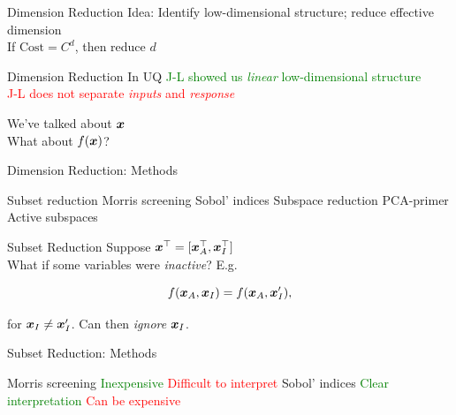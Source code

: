 \documentclass[14pt]{beamer}
\begin{document}

\begin{frame}{Dimension Reduction}
  Idea: Identify low-dimensional structure; reduce effective dimension \\
  If $\text{Cost} = C^d$, then reduce $d$
\end{frame}

\begin{frame}{Dimension Reduction \alert{In UQ}}
  \bigskip \textcolor{green}{J-L showed us \emph{linear} low-dimensional structure} \\
  \textcolor{red}{J-L does not separate \emph{inputs} and \emph{response}}

  \bigskip We've talked about $\boldsymbol{x}$ \\
  What about $f(\boldsymbol{x})$?
\end{frame}

\begin{frame}{Dimension Reduction: Methods}
  \begin{outline}
    \1 Subset reduction
      \2 Morris screening
      \2 Sobol' indices
    \1 Subspace reduction
      \2 PCA-primer
      \2 Active subspaces
  \end{outline}
\end{frame}

\begin{frame}{Subset Reduction}
  Suppose $\boldsymbol{x}^{\top} = [\boldsymbol{x}_A^{\top}, \boldsymbol{x}_I^{\top}]$ \\
  What if some variables were \emph{inactive}? E.g.

  \begin{equation}
    f(\boldsymbol{x}_A, \boldsymbol{x}_I) = f(\boldsymbol{x}_A, \boldsymbol{x}'_I),
  \end{equation}

  \noindent for $\boldsymbol{x}_I \neq \boldsymbol{x}'_I$. Can then \emph{ignore} $\boldsymbol{x}_I$.
\end{frame}

\begin{frame}{Subset Reduction: Methods}
  \begin{outline}
    \1 Morris screening
      \2 \textcolor{green}{Inexpensive}
      \2 \textcolor{red}{Difficult to interpret}
    \1 Sobol' indices
      \2 \textcolor{green}{Clear interpretation}
      \2 \textcolor{red}{Can be expensive}
  \end{outline}
\end{frame}
\end{document}
